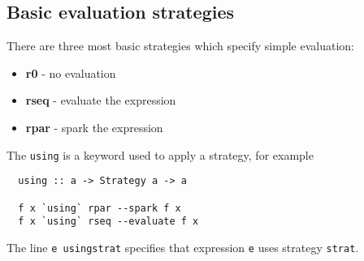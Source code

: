 \documentclass[CS4204-Notes.tex]{subfiles}
\begin{document}
\subsection{Basic evaluation strategies}
There are three most basic strategies which specify simple evaluation:
\begin{itemize}
\item \textbf{r0} - no evaluation
\item \textbf{rseq} - evaluate the expression
\item \textbf{rpar} - spark the expression
\end{itemize}
The \texttt{\textquoteback using\textquoteback} is a keyword used to apply a strategy, for example
\begin{lstlisting}
  using :: a -> Strategy a -> a

  f x `using` rpar --spark f x
  f x `using` rseq --evaluate f x
\end{lstlisting}
The line \texttt{e \textquoteback using\textquoteback strat} specifies that expression \texttt{e} uses strategy \texttt{strat}.
\end{document}
